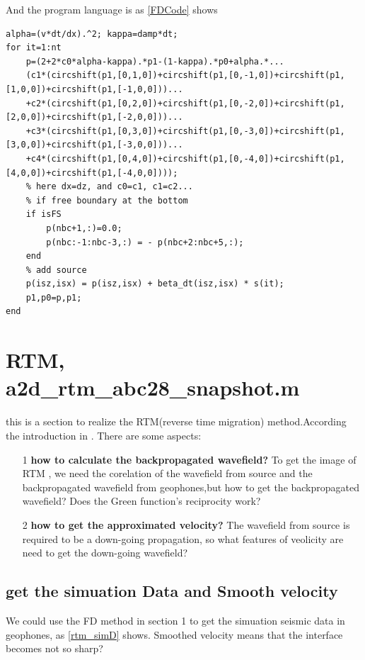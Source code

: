 \documentclass[a4paper]{article}
\begin{document}
		And the program language is as \autoref{FDCode} shows
		\begin{lstlisting}[caption=set ABC to the velocity variable (2 is same), label=FDCode,basicstyle=\tiny, numberstyle=\tiny]
% 
alpha=(v*dt/dx).^2; kappa=damp*dt;
for it=1:nt
	p=(2+2*c0*alpha-kappa).*p1-(1-kappa).*p0+alpha.*...
	(c1*(circshift(p1,[0,1,0])+circshift(p1,[0,-1,0])+circshift(p1,[1,0,0])+circshift(p1,[-1,0,0]))...
	+c2*(circshift(p1,[0,2,0])+circshift(p1,[0,-2,0])+circshift(p1,[2,0,0])+circshift(p1,[-2,0,0]))...
	+c3*(circshift(p1,[0,3,0])+circshift(p1,[0,-3,0])+circshift(p1,[3,0,0])+circshift(p1,[-3,0,0]))...
	+c4*(circshift(p1,[0,4,0])+circshift(p1,[0,-4,0])+circshift(p1,[4,0,0])+circshift(p1,[-4,0,0]))); 
	% here dx=dz, and c0=c1, c1=c2...
	% if free boundary at the bottom
	if isFS
		p(nbc+1,:)=0.0;
		p(nbc:-1:nbc-3,:) = - p(nbc+2:nbc+5,:);
	end
	% add source
	p(isz,isx) = p(isz,isx) + beta_dt(isz,isx) * s(it);
	p1,p0=p,p1;
end
    	\end{lstlisting}


\section{RTM, a2d\_rtm\_abc28\_snapshot.m}	
	this is a section to realize the RTM(reverse time migration) method.According the introduction in \cite[Schuster 2015]{SI}. There are some aspects:

	\begin{itemize}
		\item[1] \textbf{how to calculate the backpropagated wavefield?} To get the image of RTM , we need the corelation of the wavefield from source and the backpropagated wavefield from geophones,but how to get the backpropagated wavefield? Does the Green function's reciprocity work?
		\item[2] \textbf{how to get the approximated velocity?} The wavefield from source is required to be a down-going propagation, so what features of veolicity are need to get the down-going wavefield?
	\end{itemize}

	\subsection{get the simuation Data and Smooth velocity}

	We could use the FD method in section 1 to get the simuation seismic data in geophones, as \autoref{rtm_simD} shows. Smoothed velocity means that the interface becomes not so sharp?
\end{document}
